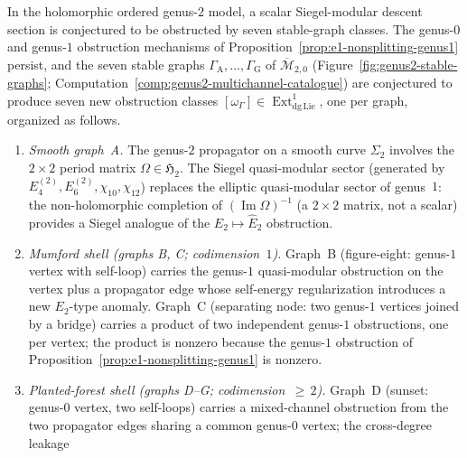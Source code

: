 \begin{conjecture}
\label{conj:e1-nonsplitting-genus2}
In the holomorphic ordered genus-$2$ model, a scalar Siegel-modular
descent section is conjectured to be obstructed by seven stable-graph classes.
The genus-$0$ and genus-$1$ obstruction mechanisms of
Proposition~\textup{\ref{prop:e1-nonsplitting-genus1}}
persist, and the seven stable graphs
$\Gamma_\mathrm{A}, \ldots, \Gamma_\mathrm{G}$ of
$\overline{\mathcal{M}}_{2,0}$
\textup{(}Figure~\textup{\ref{fig:genus2-stable-graphs}};
Computation~\textup{\ref{comp:genus2-multichannel-catalogue}}\textup{)}
are conjectured to produce seven new obstruction classes
$[\omega_\Gamma] \in \operatorname{Ext}^1_{\mathrm{dg\,Lie}}$,
one per graph, organized as follows.
\begin{enumerate}[label=\textup{(\roman*)}]
\item \emph{Smooth graph~A.}
 The genus-$2$ propagator on a smooth curve $\Sigma_2$ involves
 the $2 \times 2$ period matrix $\Omega \in \mathfrak{H}_2$.
 The Siegel quasi-modular sector
 \textup{(}generated by $E_4^{(2)}, E_6^{(2)}, \chi_{10},
 \chi_{12}$\textup{)}
 replaces the elliptic quasi-modular sector of genus~$1$:
 the non-holomorphic completion of
 $(\operatorname{Im} \Omega)^{-1}$ \textup{(}a $2 \times 2$
 matrix, not a scalar\textup{)} provides a Siegel analogue of the
 $E_2 \mapsto \widehat{E}_2$ obstruction.
\item \emph{Mumford shell \textup{(}graphs B, C; codimension~$1$\textup{)}.}
 Graph~B \textup{(}figure-eight: genus-$1$ vertex with self-loop\textup{)}
 carries the genus-$1$ quasi-modular obstruction on the vertex
 plus a propagator edge whose self-energy regularization introduces
 a new $E_2$-type anomaly. Graph~C \textup{(}separating node:
 two genus-$1$ vertices joined by a bridge\textup{)} carries
 a product of two independent genus-$1$ obstructions, one per
 vertex; the product is nonzero because the genus-$1$ obstruction
 of Proposition~\ref{prop:e1-nonsplitting-genus1} is nonzero.
\item \emph{Planted-forest shell \textup{(}graphs D--G;
 codimension~${\geq}\,2$\textup{)}.}
 Graph~D \textup{(}sunset: genus-$0$ vertex, two self-loops\textup{)}
 carries a mixed-channel obstruction from the two propagator
 edges sharing a common genus-$0$ vertex; the cross-degree leakage

\end{enumerate}
\end{conjecture}

